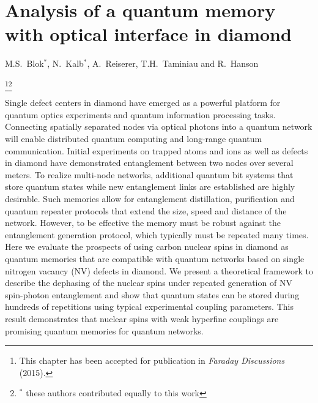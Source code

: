 \graphicspath{{./ch_C13_dephasing_LDE/figures/}}


\chapter{Analysis of a quantum memory with optical interface in diamond }
\label{ch:CDL}

\begin{center} 
    \vspace{-1cm} {M.S.~Blok$^*$, N.~Kalb$^*$, A.~Reiserer, T.H.~Taminiau and R.~Hanson} 
\end{center}

{\renewcommand{\thefootnote}{}\footnote{This chapter has been accepted for publication in
    {\em Faraday Discussions} (2015).}\footnote{$^*$ these authors contributed equally to this work}}

\vspace{-0.5cm} 

Single defect centers in diamond have emerged as a powerful platform for quantum optics experiments and quantum information processing tasks\cite{Gao_NatPhoton_2015}. Connecting spatially separated nodes via optical photons\cite{Kimble_Nature_2008} into a quantum network will enable distributed quantum computing and long-range quantum communication. Initial experiments on trapped atoms and ions as well as defects in diamond have demonstrated entanglement between two nodes over several meters\cite{Moehring_Nature_2007,Ritter_Nature_2012,Hofmann_Science_2012,Bernien_Nature_2013}. To realize multi-node networks, additional quantum bit systems that store quantum states while new entanglement links are established are highly desirable. Such memories allow for entanglement distillation, purification and quantum repeater protocols that extend the size, speed and distance of the network\cite{Bennett_Phys.Rev.Lett._1996,Campbell_Phys.Rev.Lett._2008,Briegel_Phys.Rev.Lett._1998,Childress_Phys.Rev.Lett._2006}. However, to be effective the memory must be robust against the entanglement generation protocol, which typically must be repeated many times. Here we evaluate the prospects of using carbon nuclear spins in diamond as quantum memories that are compatible with quantum networks based on single nitrogen vacancy (NV) defects in diamond. We present a theoretical framework to describe the dephasing of the nuclear spins under repeated generation of NV spin-photon entanglement and show that quantum states can be stored during hundreds of repetitions using typical experimental coupling parameters. This result demonstrates that nuclear spins with weak hyperfine couplings are promising quantum memories for quantum networks.
\clearpage

